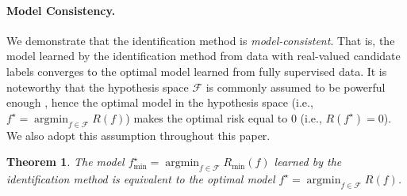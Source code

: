 \documentclass[letterpaper]{article} %
\newtheorem{thm}{Theorem}
\newcommand{\argmin}{\mathop{\arg\min}}
\begin{document}
\paragraph{Model Consistency.} We demonstrate that the identification method is \emph{model-consistent}. That is, the model learned by the identification method from data with real-valued candidate labels converges to the optimal model learned from fully supervised data. It is noteworthy that the hypothesis space $\mathcal{F}$ is commonly assumed to be powerful enough \cite{lv2020progressive}, hence the optimal model in the hypothesis space (i.e., $f^\star = \argmin_{f\in\mathcal{F}}{R}(f)$) makes the optimal risk equal to 0 (i.e., $R(f^\star)=0$). We also adopt this assumption throughout this paper.
\begin{thm}
\label{thm1}
The model $f^\star_{\mathrm{min}}=\argmin_{f\in\mathcal{F}}R_{\mathrm{min}}(f)$ learned by the identification method is equivalent to the optimal model $f^\star = \argmin_{f\in\mathcal{F}}{R}(f)$.
\end{thm}
\end{document}

